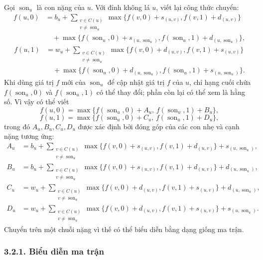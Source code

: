 \documentclass[11pt]{article}
\begin{document}
Gọi \(\operatorname{son}_u\) là con nặng của \(u\). Với đỉnh không lá \(u\),
viết lại công thức chuyển:
\[
\begin{aligned}
f(u,0)
&=b_u+\sum_{\substack{v\in C(u)\\v\ne\operatorname{son}_u}}
\max\{f(v,0)+s_{(u,v)},f(v,1)+d_{(u,v)}\}\\
&\quad+\max\{f(\operatorname{son}_u,0)+s_{(u,\operatorname{son}_u)},
f(\operatorname{son}_u,1)+d_{(u,\operatorname{son}_u)}\},
\end{aligned}
\]
\[
\begin{aligned}
f(u,1)
&=w_u+\sum_{\substack{v\in C(u)\\v\ne\operatorname{son}_u}}
\max\{f(v,0)+d_{(u,v)},f(v,1)+s_{(u,v)}\}\\
&\quad+\max\{f(\operatorname{son}_u,0)+d_{(u,\operatorname{son}_u)},
f(\operatorname{son}_u,1)+s_{(u,\operatorname{son}_u)}\}.
\end{aligned}
\]
Khi dùng giá trị \(f\) mới của \(\operatorname{son}_u\) để cập nhật giá trị
\(f\) của \(u\), chỉ hạng cuối chứa \(f(\operatorname{son}_u,0)\) và
\(f(\operatorname{son}_u,1)\) có thể thay đổi; phần còn lại có thể xem là
hằng số. Vì vậy có thể viết
\[
  f(u,0)=\max\{f(\operatorname{son}_u,0)+A_u,\,
               f(\operatorname{son}_u,1)+B_u\},
\]
\[
  f(u,1)=\max\{f(\operatorname{son}_u,0)+C_u,\,
               f(\operatorname{son}_u,1)+D_u\},
\]
trong đó \(A_u,B_u,C_u,D_u\) được xác định bởi đóng góp của các con nhẹ và
cạnh nặng tương ứng:
\[
\begin{aligned}
A_u&=b_u+\sum_{\substack{v\in C(u)\\v\ne\operatorname{son}_u}}
\max\{f(v,0)+s_{(u,v)},f(v,1)+d_{(u,v)}\}+s_{(u,\operatorname{son}_u)},\\
B_u&=b_u+\sum_{\substack{v\in C(u)\\v\ne\operatorname{son}_u}}
\max\{f(v,0)+s_{(u,v)},f(v,1)+d_{(u,v)}\}+d_{(u,\operatorname{son}_u)},\\
C_u&=w_u+\sum_{\substack{v\in C(u)\\v\ne\operatorname{son}_u}}
\max\{f(v,0)+d_{(u,v)},f(v,1)+s_{(u,v)}\}+d_{(u,\operatorname{son}_u)},\\
D_u&=w_u+\sum_{\substack{v\in C(u)\\v\ne\operatorname{son}_u}}
\max\{f(v,0)+d_{(u,v)},f(v,1)+s_{(u,v)}\}+s_{(u,\operatorname{son}_u)}.
\end{aligned}
\]
Chuyển trên một chuỗi nặng vì thế có thể biểu diễn bằng dạng giống ma trận.

\subsubsection*{3.2.1. Biểu diễn ma trận}
\end{document}
